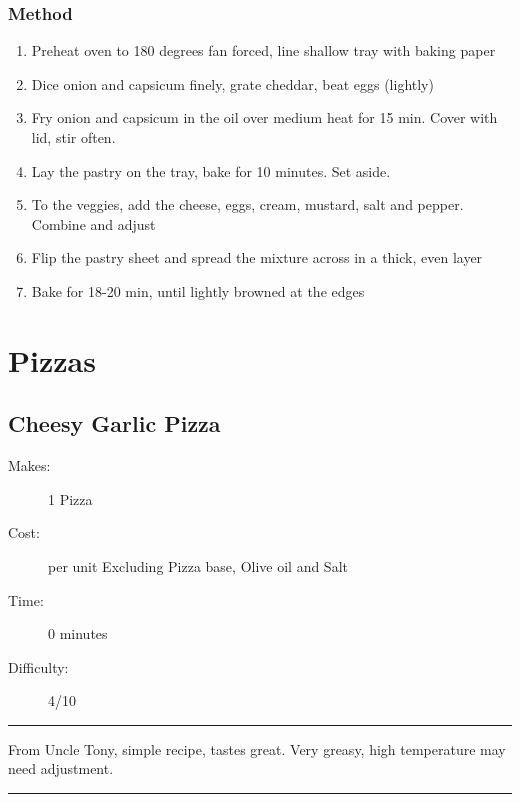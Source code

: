 \documentclass[]{article}
\begin{document}
\subsubsection*{\Large Method}
\begin{enumerate}[font=\huge\color{accent}]
	\item Preheat oven to 180 degrees fan forced, line shallow tray with baking paper
	\item Dice onion and capsicum finely, grate cheddar, beat eggs (lightly)
	\item Fry onion and capsicum in the oil over medium heat for 15 min. Cover with lid, stir often.
	\item Lay the pastry on the tray, bake for 10 minutes. Set aside.
	\item To the veggies, add the cheese, eggs, cream, mustard, salt and pepper. Combine and adjust
	\item Flip the pastry sheet and spread the mixture across in a thick, even layer
	\item Bake for 18-20 min, until lightly browned at the edges
\end{enumerate}
\newpage
{}
\section*{\center\Huge\color{accent}Pizzas}
\label{cat:Pizzas}
\label{rec:Cheesy Garlic Pizza}
\subsection*{\center\huge Cheesy Garlic Pizza}
\begin{description}
\item[Makes:] 1 Pizza
\item[Cost:]  per unit Excluding Pizza base, Olive oil and Salt
\item[Time:] 0 minutes
\item[Difficulty:] 4/10
\end{description}
\vspace{0.2cm}\hrule\vspace{0.5cm}
\begin{adjustwidth}{0.5 cm}{0.5 cm}

From Uncle Tony, simple recipe, tastes great. Very greasy, high temperature may need adjustment. \hfill\color{accent}{\Large\faVimeoSquare\hspace{0.1cm}\faTruck\hspace{0.1cm}\faHeart\hspace{0.1cm}}\color{black}

\end{adjustwidth}
\vspace{0.5cm}\hrule
\end{document}

